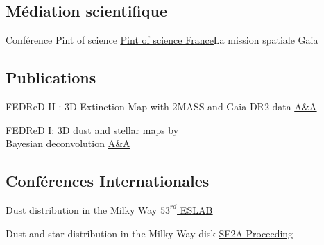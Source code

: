 \documentclass[
 a4paper, 10.5pt,
  sidebarwidth=0.32\paperwidth,
]{fortysecondscv}
\begin{document}
\subsection{Médiation scientifique}
\begin{cvtable}
  {Conférence Pint of science}
  {\href{https://pintofscience.fr/}{\underline{Pint of science France}}}{La mission spatiale Gaia}
\end{cvtable}


\subsection{Publications}
\begin{cvtable}
  {FEDReD II : 3D Extinction Map with 2MASS and Gaia DR2 data}
  {\href{https://ui.adsabs.harvard.edu/abs/2020arXiv200703734H/abstract}{\underline{A\&A}}}
  {}

  {FEDReD I: 3D dust and stellar maps by \\Bayesian deconvolution}
  {\href{https://ui.adsabs.harvard.edu/abs/2020arXiv200704455B/abstract}{\underline{A\&A}}}
  {}
\end{cvtable}

\subsection{Conférences Internationales}
\begin{cvtable}
  {Dust distribution in the Milky Way}
  {\href{https://ui.adsabs.harvard.edu/abs/2019gaia.confE..55H/abstract}{\underline{$53^{rd}$ ESLAB}}}
  {}

  {Dust and star distribution in the Milky Way disk}
  {\href{https://ui.adsabs.harvard.edu/\#abs/2018sf2a.conf..345H/abstract}{\underline{SF2A Proceeding}}}
  {}
\end{cvtable}


\begin{cvtable}

\end{cvtable}
\end{document}
